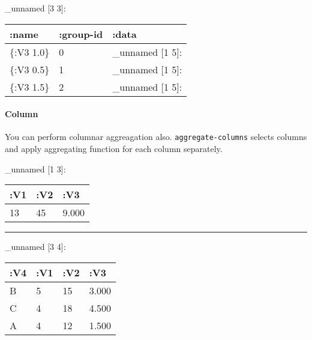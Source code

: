\documentclass[]{article}
\newenvironment{Shaded}{\begin{snugshade}}{\end{snugshade}}
\newcommand{\KeywordTok}[1]{\textcolor[rgb]{0.13,0.29,0.53}{\textbf{#1}}}
\newcommand{\VariableTok}[1]{\textcolor[rgb]{0.00,0.00,0.00}{#1}}
\newcommand{\AttributeTok}[1]{\textcolor[rgb]{0.77,0.63,0.00}{#1}}
\newcommand{\NormalTok}[1]{#1}
\let\oldparagraph\paragraph
\renewcommand{\paragraph}[1]{\oldparagraph{#1}\mbox{}}
\begin{document}
\_unnamed {[}3 3{]}:

\begin{longtable}[]{@{}lll@{}}
\toprule
:name & :group-id & :data\tabularnewline
\midrule
\endhead
\{:V3 1.0\} & 0 & \_unnamed {[}1 5{]}:\tabularnewline
\{:V3 0.5\} & 1 & \_unnamed {[}1 5{]}:\tabularnewline
\{:V3 1.5\} & 2 & \_unnamed {[}1 5{]}:\tabularnewline
\bottomrule
\end{longtable}

\paragraph{Column}\label{column}

You can perform columnar aggreagation also. \texttt{aggregate-columns}
selects columns and apply aggregating function for each column
separately.

\begin{Shaded}
\end{Shaded}

\_unnamed {[}1 3{]}:

\begin{longtable}[]{@{}lll@{}}
\toprule
:V1 & :V2 & :V3\tabularnewline
\midrule
\endhead
13 & 45 & 9.000\tabularnewline
\bottomrule
\end{longtable}

\begin{center}\rule{0.5\linewidth}{0.5pt}\end{center}

\begin{Shaded}
\end{Shaded}

\_unnamed {[}3 4{]}:

\begin{longtable}[]{@{}llll@{}}
\toprule
:V4 & :V1 & :V2 & :V3\tabularnewline
\midrule
\endhead
B & 5 & 15 & 3.000\tabularnewline
C & 4 & 18 & 4.500\tabularnewline
A & 4 & 12 & 1.500\tabularnewline
\bottomrule
\end{longtable}
\end{document}
